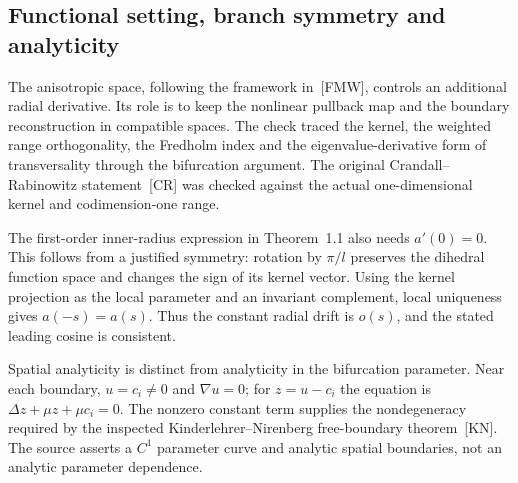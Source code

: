 \documentclass[10pt]{article}
\begin{document}
\subsection*{Functional setting, branch symmetry and analyticity}
The anisotropic space, following the framework in [FMW], controls an additional radial derivative. Its role is to keep the nonlinear pullback map and the boundary reconstruction in compatible spaces. The check traced the kernel, the weighted range orthogonality, the Fredholm index and the eigenvalue-derivative form of transversality through the bifurcation argument. The original Crandall–Rabinowitz statement [CR] was checked against the actual one-dimensional kernel and codimension-one range.\par
The first-order inner-radius expression in Theorem 1.1 also needs \(a'(0)=0\). This follows from a justified symmetry: rotation by \(\pi/l\) preserves the dihedral function space and changes the sign of its kernel vector. Using the kernel projection as the local parameter and an invariant complement, local uniqueness gives \(a(-s)=a(s)\). Thus the constant radial drift is \(o(s)\), and the stated leading cosine is consistent.\par
Spatial analyticity is distinct from analyticity in the bifurcation parameter. Near each boundary, \(u=c_i\ne0\) and \(\nabla u=0\); for \(z=u-c_i\) the equation is \(\Delta z+\mu z+\mu c_i=0\). The nonzero constant term supplies the nondegeneracy required by the inspected Kinderlehrer–Nirenberg free-boundary theorem [KN]. The source asserts a \(C^1\) parameter curve and analytic spatial boundaries, not an analytic parameter dependence.\par
\end{document}
